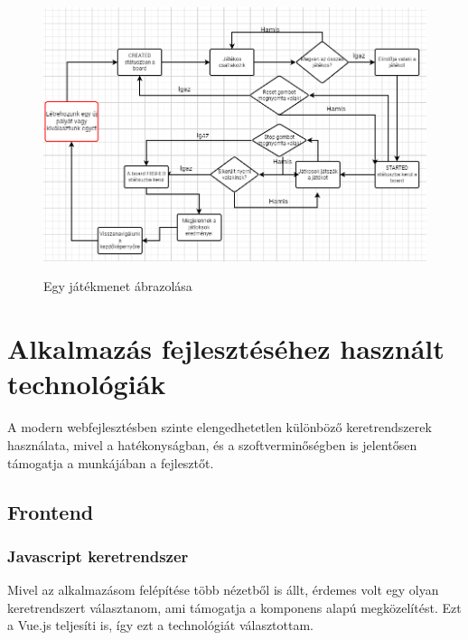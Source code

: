 \documentclass[a4paper,twoside]{article}
\begin{document}
\begin{figure}
	\caption{Egy játékmenet ábrazolása}
	\raggedleft 
	\includegraphics[scale=0.5]{folyamatabra}
	\label{folyamatabra}
\end{figure}
\newpage
\section{Alkalmazás fejlesztéséhez használt technológiák}
A modern webfejlesztésben szinte elengedhetetlen különböző keretrendszerek használata,
mivel a hatékonyságban, és a szoftverminőségben is jelentősen támogatja a munkájában a fejlesztőt.
\subsection{Frontend}

\subsubsection{Javascript keretrendszer}
Mivel az alkalmazásom felépítése több nézetből is állt, érdemes volt egy olyan keretrendszert választanom, ami támogatja a komponens 
alapú megközelítést. Ezt a  Vue.js\cite{vuejs} teljesíti is, így ezt a technológiát választottam. 
\end{document}
